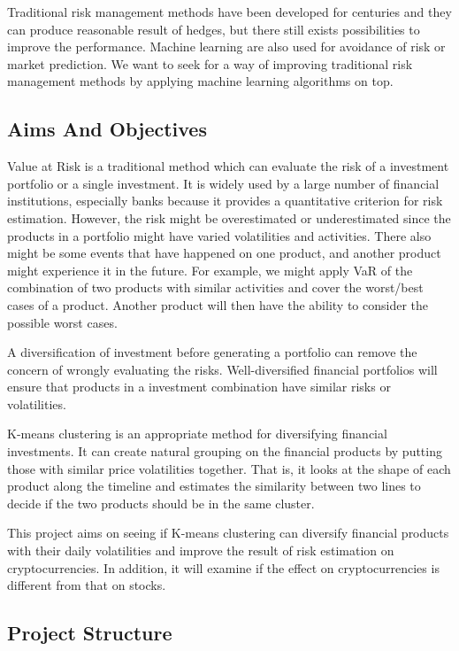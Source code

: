 \documentclass[11pt]{article} %
\theoremstyle{plain}
\theoremstyle{definition}
\begin{document}
Traditional risk management methods have been developed for centuries and they can produce reasonable result of hedges, but there still exists possibilities to improve the performance. Machine learning are also used for avoidance of risk or market prediction. We want to seek for a way of improving traditional risk management methods by applying machine learning algorithms on top.

\subsection{Aims And Objectives}

Value at Risk is a traditional method which can evaluate the risk of a investment portfolio or a single investment. It is widely used by a large number of financial institutions, especially banks because it provides a quantitative criterion for risk estimation. However, the risk might be overestimated or underestimated since the products in a portfolio might have varied volatilities and activities. There also might be some events that have happened on one product, and another product might experience it in the future. For example, we might apply VaR of the combination of two products with similar activities and cover the worst/best cases of a product. Another product will then have the ability to consider the possible worst cases.

A diversification of investment before generating a portfolio can remove the concern of wrongly evaluating the risks. Well-diversified financial portfolios will ensure that products in a investment combination have similar risks or volatilities.

K-means clustering is an appropriate method for diversifying financial investments. It can create natural grouping on the financial products by putting those with similar price volatilities together. That is, it looks at the shape of each product along the timeline and estimates the similarity between two lines to decide if the two products should be in the same cluster.

This project aims on seeing if K-means clustering can diversify financial products with their daily volatilities and improve the result of risk estimation on cryptocurrencies. In addition, it will examine if the effect on cryptocurrencies is different from that on stocks.

\subsection{Project Structure}
\end{document}
